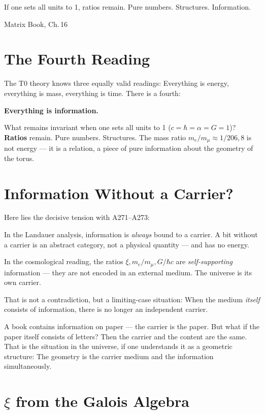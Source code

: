 
\epigraph{If one sets all units to 1, ratios remain.
Pure numbers. Structures. Information.}{Matrix Book, Ch.\,16}

\section{The Fourth Reading}

The T0 theory knows three equally valid readings: Everything is energy,
everything is mass, everything is time. There is a fourth:

\textbf{Everything is information.}

What remains invariant when one sets all units to 1
($c = \hbar = \alpha = G = 1$)? \textbf{Ratios} remain.
Pure numbers. Structures. The mass ratio $m_e/m_\mu \approx 1/206{,}8$
is not energy --- it is a relation, a piece of pure information
about the geometry of the torus. 

\section{Information Without a Carrier?}

Here lies the decisive tension with A271--A273:

In the Landauer analysis, information is \emph{always} bound to a carrier.
A bit without a carrier is an abstract category, not a
physical quantity --- and has no energy. 

In the cosmological reading, the ratios $\xi, m_e/m_\mu, G/\hbar c$
are \emph{self-supporting} information --- they are not encoded in an external
medium. The universe is its own carrier.

That is not a contradiction, but a limiting-case situation: When the medium
\emph{itself} consists of information, there is no longer an independent carrier.

\begin{laierspur}
A book contains information on paper --- the carrier is the paper.
But what if the paper itself consists of letters?
Then the carrier and the content are the same. That is the situation in the
universe, if one understands it as a geometric structure: The geometry
is the carrier medium and the information simultaneously.
\end{laierspur}

\section[\texorpdfstring{$\xi$}{xi} from the Galois Algebra]{$\xi$ from the Galois Algebra}

